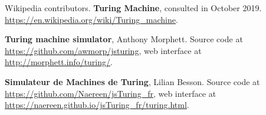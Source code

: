 \documentclass[runningheads]{llncs}
\begin{document}
%
%
% 
% 
%
\begin{thebibliography}{8}
    Wikipedia contributors.
    \textbf{Turing Machine}, consulted in October 2019.
    \url{https://en.wikipedia.org/wiki/Turing_machine}.

    \textbf{Turing machine simulator},
    Anthony Morphett.
    Source code at \url{https://github.com/awmorp/jsturing},
    web interface at \url{http://morphett.info/turing/}.

    \textbf{Simulateur de Machines de Turing},
    Lilian Besson.
    Source code at \url{https://github.com/Naereen/jsTuring_fr},
    web interface at \url{https://naereen.github.io/jsTuring_fr/turing.html}.
\end{thebibliography}
\end{document}
